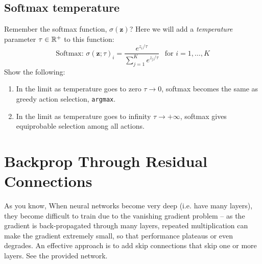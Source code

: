 \subsection{Softmax temperature}
Remember the softmax function, $\sigma(\mathbf{z})$? 
Here we will add a \emph{temperature} parameter $\tau \in \mathbb{R}^+$ to this function: 
$$
    \text{Softmax: } \sigma(\mathbf{z}; \tau)_i = \frac{e^{z_i/ \tau}}{\sum_{j=1}^K e^{z_j/ \tau}} \ \ \text{ for } i = 1, \dotsc, K 
$$
Show the following: 
\begin{enumerate}
    \item In the limit as temperature goes to zero $\tau \rightarrow 0 $, softmax becomes the same as greedy action selection, {\tt argmax}.
    \item In the limit as temperature goes to infinity $\tau \rightarrow +\infty$, softmax gives equiprobable selection among all actions. \\
\end{enumerate} 


\section{Backprop Through Residual Connections}  
    As you know, When neural networks become very deep (i.e. have many layers), they become difficult to train due to the vanishing gradient problem – as the gradient is back-propagated through many layers, repeated multiplication can make the gradient extremely small, so that performance plateaus or even degrades.
    An effective approach is to add skip connections that skip one or more layers. See the provided network. 

